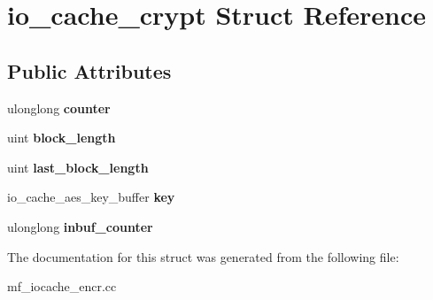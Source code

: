 \hypertarget{structio__cache__crypt}{}\section{io\+\_\+cache\+\_\+crypt Struct Reference}
\label{structio__cache__crypt}
\subsection*{Public Attributes}
\begin{DoxyCompactItemize}
\item 
\mbox{\label{structio__cache__crypt_a8da99b891a0902acb40563fbb3bd16ea}} 
ulonglong {\bfseries counter}
\item 
\mbox{\label{structio__cache__crypt_acd73c760526f17071c93adecd6013f2a}} 
uint {\bfseries block\+\_\+length}
\item 
\mbox{\label{structio__cache__crypt_ad3a2242282fd4eba028870ce00d4b194}} 
uint {\bfseries last\+\_\+block\+\_\+length}
\item 
\mbox{\label{structio__cache__crypt_a3105e5a2b67ad6d6e282c956844fd3e0}} 
io\+\_\+cache\+\_\+aes\+\_\+key\+\_\+buffer {\bfseries key}
\item 
\mbox{\label{structio__cache__crypt_a7a29ba3edcf3fb7a8af4b077f8d7cd45}} 
ulonglong {\bfseries inbuf\+\_\+counter}
\end{DoxyCompactItemize}


The documentation for this struct was generated from the following file\+:\begin{DoxyCompactItemize}
\item 
mf\+\_\+iocache\+\_\+encr.\+cc\end{DoxyCompactItemize}
